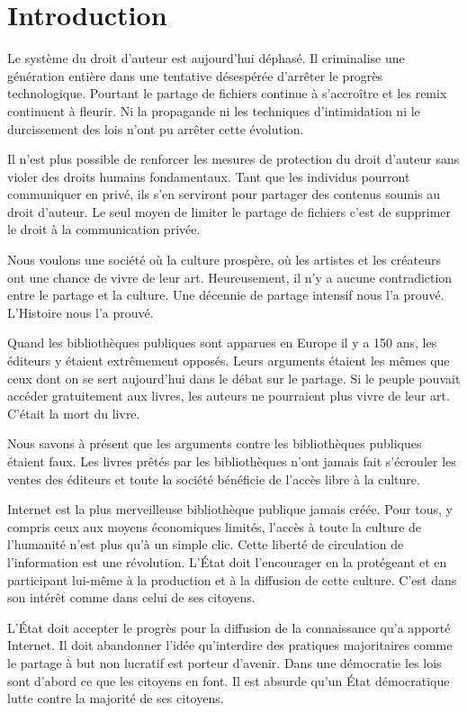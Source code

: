 \chapter*{Introduction}\label{premintro}

Le système du droit d’auteur est aujourd’hui déphasé. Il criminalise une génération entière dans une tentative désespérée d’arrêter le progrès technologique. Pourtant le partage de fichiers continue à s’accroître et les remix continuent à fleurir. Ni la propagande ni les techniques d’intimidation ni le durcissement des lois n’ont pu arrêter cette évolution.

Il n’est plus possible de renforcer les mesures de protection du droit d'auteur sans violer des droits humains fondamentaux. Tant que les individus pourront communiquer en privé, ils s’en serviront pour partager des contenus soumis au droit d’auteur. Le seul moyen de limiter le partage de fichiers c’est de supprimer le droit à la communication privée.

Nous voulons une société où la culture prospère, où les artistes et les créateurs ont une chance de vivre de leur art. Heureusement, il n’y a aucune contradiction entre le partage et la culture. Une décennie de partage intensif nous l’a prouvé. L'Histoire nous l'a prouvé.

Quand les bibliothèques publiques sont apparues en Europe il y a 150 ans, les éditeurs y étaient extrêmement opposés. Leurs arguments étaient les mêmes que ceux dont on se sert aujourd’hui dans le débat sur le partage. Si le peuple pouvait accéder gratuitement aux livres, les auteurs ne pourraient plus vivre de leur art. C'était la mort du livre.

Nous savons à présent que les arguments contre les bibliothèques publiques étaient faux. Les livres prêtés par les bibliothèques n'ont jamais fait s'écrouler les ventes des éditeurs et toute la société bénéficie de l'accès libre à la culture. 

Internet est la plus merveilleuse bibliothèque publique jamais créée. Pour tous, y compris ceux aux moyens économiques limités, l’accès à toute la culture de l’humanité n’est plus qu’à un simple clic. Cette liberté de circulation de l'information est une révolution. L'État doit l'encourager en la protégeant et en participant lui-même à la production et à la diffusion de cette culture. C'est dans son intérêt comme dans celui de ses citoyens. 

L'État doit accepter le progrès pour la diffusion de la connaissance qu'a apporté Internet. Il doit abandonner l'idée qu'interdire des pratiques majoritaires comme le partage à but non lucratif est porteur d'avenir. Dans une démocratie les lois sont d'abord ce que les citoyens en font. Il est absurde qu'un État démocratique lutte contre la majorité de ses citoyens.

